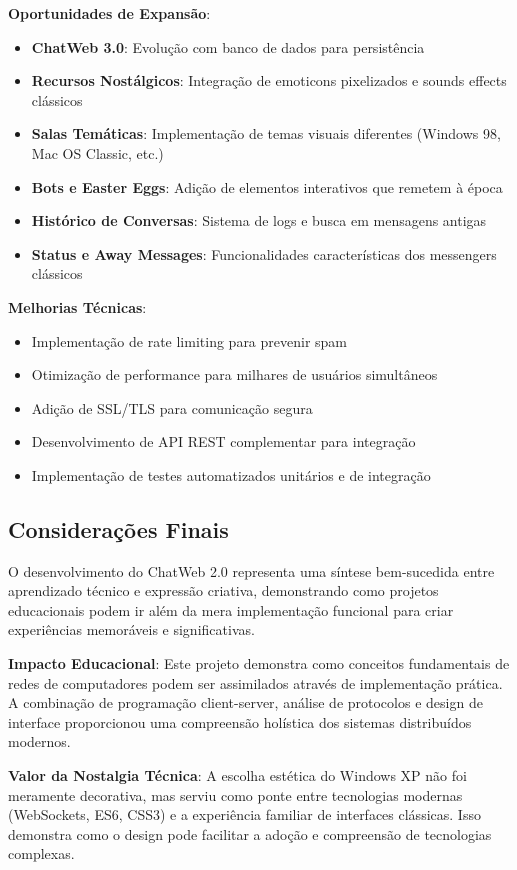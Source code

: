 \documentclass[conference,compsoc]{IEEEtran}
\begin{document}
\begin{otherlanguage}{brazil}
\textbf{Oportunidades de Expansão}:
\begin{itemize}
\item \textbf{ChatWeb 3.0}: Evolução com banco de dados para persistência
\item \textbf{Recursos Nostálgicos}: Integração de emoticons pixelizados e sounds effects clássicos
\item \textbf{Salas Temáticas}: Implementação de temas visuais diferentes (Windows 98, Mac OS Classic, etc.)
\item \textbf{Bots e Easter Eggs}: Adição de elementos interativos que remetem à época
\item \textbf{Histórico de Conversas}: Sistema de logs e busca em mensagens antigas
\item \textbf{Status e Away Messages}: Funcionalidades características dos messengers clássicos
\end{itemize}

\textbf{Melhorias Técnicas}:
\begin{itemize}
\item Implementação de rate limiting para prevenir spam
\item Otimização de performance para milhares de usuários simultâneos
\item Adição de SSL/TLS para comunicação segura
\item Desenvolvimento de API REST complementar para integração
\item Implementação de testes automatizados unitários e de integração
\end{itemize}

\subsection{Considerações Finais}

O desenvolvimento do ChatWeb 2.0 representa uma síntese bem-sucedida entre aprendizado técnico e expressão criativa, demonstrando como projetos educacionais podem ir além da mera implementação funcional para criar experiências memoráveis e significativas.

\textbf{Impacto Educacional}: Este projeto demonstra como conceitos fundamentais de redes de computadores podem ser assimilados através de implementação prática. A combinação de programação client-server, análise de protocolos e design de interface proporcionou uma compreensão holística dos sistemas distribuídos modernos.

\textbf{Valor da Nostalgia Técnica}: A escolha estética do Windows XP não foi meramente decorativa, mas serviu como ponte entre tecnologias modernas (WebSockets, ES6, CSS3) e a experiência familiar de interfaces clássicas. Isso demonstra como o design pode facilitar a adoção e compreensão de tecnologias complexas.


\end{otherlanguage}
\end{document}
